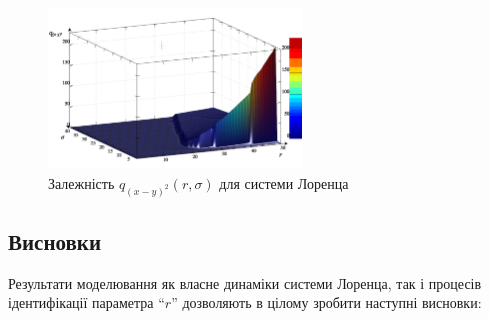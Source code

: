 \begin{figure}[htb!]
  \begin{center}
    \includegraphics[width=0.60\textwidth]{p/cha/lor/q2d/lor_qxmy2_r_sigma.png}
  \end{center}
  \caption{Залежність $ q_{(x-y)^2} (r, \sigma) $ для системи Лоренца}
  \label{atu:f:lor_qxmy2_r_sigma}
\end{figure}



\subsection{Висновки}  %

Результати моделювання як власне динаміки системи Лоренца,
так і процесів ідентифікації параметра ``$r$'' дозволяють в
цілому зробити наступні висновки:

